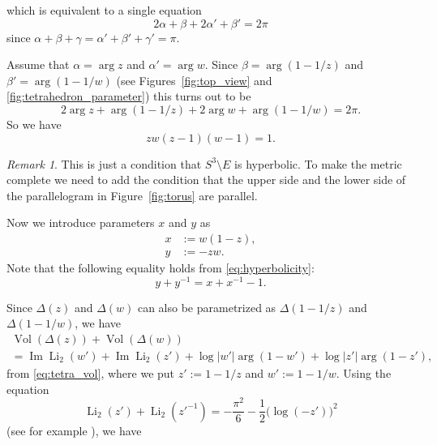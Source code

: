 \documentclass{amsart}
\newcommand{\Vol}{\operatorname{Vol}}
\newcommand{\Li}{\operatorname{Li}}
\renewcommand{\Im}{\operatorname{Im}}
\theoremstyle{definition}
\theoremstyle{remark}
\newtheorem{remark}[theorem]{Remark}
\numberwithin{equation}{section}
\begin{document}
which is equivalent to a single equation
\begin{equation*}
  2\alpha+\beta+2\alpha'+\beta'=2\pi
\end{equation*}
since $\alpha+\beta+\gamma=\alpha'+\beta'+\gamma'=\pi$.
\par
Assume that $\alpha=\arg{z}$ and $\alpha'=\arg{w}$.
Since $\beta=\arg(1-1/z)$ and $\beta'=\arg(1-1/w)$ (see Figures~\ref{fig:top_view} and \ref{fig:tetrahedron_parameter}) this turns out to be
\begin{equation*}
  2\arg{z}+\arg(1-1/z)+2\arg{w}+\arg(1-1/w)=2\pi.
\end{equation*}
So we have
\begin{equation}\label{eq:hyperbolicity}
  zw(z-1)(w-1)=1.
\end{equation}
\begin{remark}
This is just a condition that $S^3\setminus{E}$ is hyperbolic.
To make the metric complete we need to add the condition that the upper side and the lower side of the parallelogram in Figure~\ref{fig:torus} are parallel.
\end{remark}
Now we introduce parameters $x$ and $y$ as
\begin{equation}\label{eq:xyzw}
\begin{split}
  x&:=w(1-z),
  \\
  y&:=-zw.
\end{split}
\end{equation}
Note that the following equality holds from \eqref{eq:hyperbolicity}:
\begin{equation}\label{eq:xy}
  y+y^{-1}=x+x^{-1}-1.
\end{equation}
\par
Since $\Delta(z)$ and $\Delta(w)$ can also be parametrized as $\Delta(1-1/z)$ and $\Delta(1-1/w)$, we have
\begin{multline*}
  \Vol(\Delta(z))+\Vol(\Delta(w))
  \\
  =
  \Im\Li_2(w')+\Im\Li_2(z')+\log|w'|\arg(1-w')+\log|z'|\arg(1-z'),
\end{multline*}
from \eqref{eq:tetra_vol}, where we put $z':=1-1/z$ and $w':=1-1/w$.
Using the equation
\begin{equation*}
  \Li_2(z')+\Li_2({z'}^{-1})
  =
  -\frac{\pi^2}{6}-\frac{1}{2}\bigl(\log(-z')\bigr)^2
\end{equation*}
(see for example \cite[\S~1.2]{Zagier:2007}), we have
\end{document}
